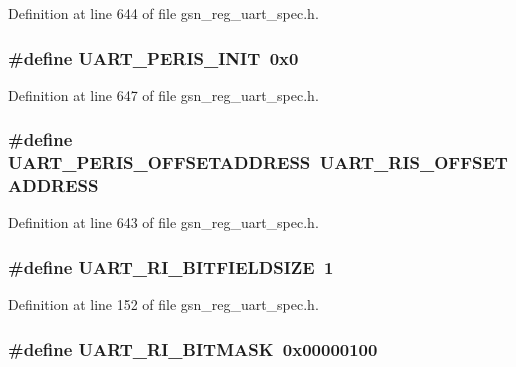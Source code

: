Definition at line 644 of file gsn\_\-reg\_\-uart\_\-spec.h.

\hypertarget{a00575_aed2bc1f9f10b829cc66b4b59d77e9dae}{
\subsubsection[{UART\_\-PERIS\_\-INIT}]{\setlength{\rightskip}{0pt plus 5cm}\#define UART\_\-PERIS\_\-INIT~0x0}}
\label{a00575_aed2bc1f9f10b829cc66b4b59d77e9dae}


Definition at line 647 of file gsn\_\-reg\_\-uart\_\-spec.h.

\hypertarget{a00575_a2d4aa0fbe2682f0ebed0f8a700b1b766}{
\subsubsection[{UART\_\-PERIS\_\-OFFSETADDRESS}]{\setlength{\rightskip}{0pt plus 5cm}\#define UART\_\-PERIS\_\-OFFSETADDRESS~UART\_\-RIS\_\-OFFSETADDRESS}}
\label{a00575_a2d4aa0fbe2682f0ebed0f8a700b1b766}


Definition at line 643 of file gsn\_\-reg\_\-uart\_\-spec.h.

\hypertarget{a00575_a09bf31fcee8b01058706bfc98b5df5fb}{
\subsubsection[{UART\_\-RI\_\-BITFIELDSIZE}]{\setlength{\rightskip}{0pt plus 5cm}\#define UART\_\-RI\_\-BITFIELDSIZE~1}}
\label{a00575_a09bf31fcee8b01058706bfc98b5df5fb}


Definition at line 152 of file gsn\_\-reg\_\-uart\_\-spec.h.

\hypertarget{a00575_aba8c700a8cca6523600a41577cdf3c91}{
\subsubsection[{UART\_\-RI\_\-BITMASK}]{\setlength{\rightskip}{0pt plus 5cm}\#define UART\_\-RI\_\-BITMASK~0x00000100}}
\label{a00575_aba8c700a8cca6523600a41577cdf3c91}



